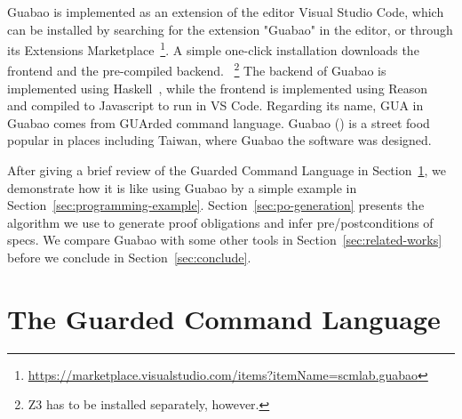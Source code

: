 \documentclass[runningheads]{llncs}
\begin{document}
Guabao is implemented as an extension of the editor Visual Studio Code,
which can be installed by searching for the extension "Guabao" in the editor, or through its Extensions Marketplace~\footnote{\url{https://marketplace.visualstudio.com/items?itemName=scmlab.guabao}}.
A simple one-click installation downloads the frontend and the pre-compiled backend.%
~\footnote{Z3 has to be installed separately, however.}
The backend of Guabao is implemented using Haskell~\cite{PeytonJones:03:Haskell}, while the frontend is implemented using Reason~\cite{Walke:16:Reason} and compiled to Javascript to run in VS Code.
Regarding its name,
GUA in Guabao comes from GUArded command language.
Guabao () is a street food popular in places including Taiwan, where Guabao the software was designed.

After giving a brief review of the Guarded Command Language in Section~\ref{sec:gcl}, we demonstrate how it is like using Guabao by a simple example in Section~\ref{sec:programming-example}.
Section~\ref{sec:po-generation} presents the algorithm we use to generate proof obligations and infer pre/postconditions of specs.
We compare Guabao with some other tools in Section~\ref{sec:related-works}
before we conclude in Section~\ref{sec:conclude}.

\section{The Guarded Command Language}
\label{sec:gcl}
\end{document}
